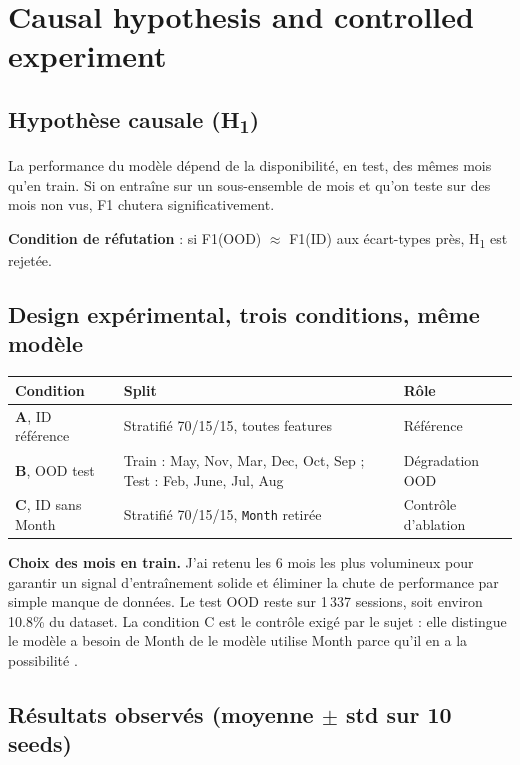 \documentclass[11pt,a4paper]{article}
\newcommand{\code}[1]{\texttt{\small#1}}
\begin{document}
\section{Causal hypothesis and controlled experiment}

\subsection*{Hypothèse causale (H\textsubscript{1})}

\begin{quotebox}
La performance du modèle dépend de la disponibilité, en test, des mêmes mois qu'en train. Si on entraîne sur un sous-ensemble de mois et qu'on teste sur des mois non vus, F1 chutera significativement.
\end{quotebox}

\textbf{Condition de réfutation} : si F1(OOD) $\approx$ F1(ID) aux écart-types près, H\textsubscript{1} est rejetée.

\subsection*{Design expérimental, trois conditions, même modèle}

\begin{center}
\begin{tabularx}{\textwidth}{lXl}
\toprule
\textbf{Condition} & \textbf{Split} & \textbf{Rôle} \\
\midrule
\textbf{A}, ID référence    & Stratifié 70/15/15, toutes features          & Référence \\
\textbf{B}, OOD test        & Train : May, Nov, Mar, Dec, Oct, Sep ; Test : Feb, June, Jul, Aug & Dégradation OOD \\
\textbf{C}, ID sans Month   & Stratifié 70/15/15, \code{Month} retirée     & Contrôle d'ablation \\
\bottomrule
\end{tabularx}
\end{center}

\textbf{Choix des mois en train.} J'ai retenu les 6 mois les plus volumineux pour garantir un signal d'entraînement solide et éliminer la chute de performance par simple manque de données. Le test OOD reste sur 1\,337 sessions, soit environ 10.8\% du dataset. La condition C est le contrôle exigé par le sujet : elle distingue \og le modèle a besoin de Month \fg{} de \og le modèle utilise Month parce qu'il en a la possibilité \fg{}.

\subsection*{Résultats observés (moyenne $\pm$ std sur 10 seeds)}
\end{document}
